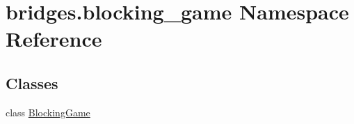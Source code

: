 \hypertarget{namespacebridges_1_1blocking__game}{}\section{bridges.\+blocking\+\_\+game Namespace Reference}
\label{namespacebridges_1_1blocking__game}
\subsection*{Classes}
\begin{DoxyCompactItemize}
\item 
class \mbox{\hyperlink{classbridges_1_1blocking__game_1_1_blocking_game}{Blocking\+Game}}
\end{DoxyCompactItemize}
